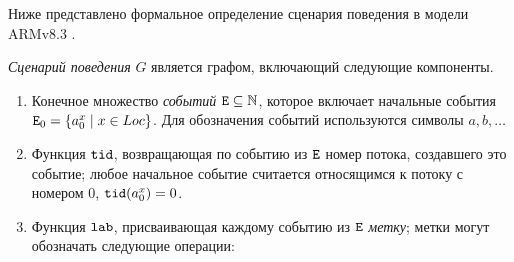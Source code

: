 Ниже представлено формальное определение сценария поведения в
модели ARMv8.3 \cite{Pulte-al:POPL18}.
\begin{definition}
\label{def:execution}
\emph{Сценарий поведения} $G$ является графом, включающий следующие компоненты.
\begin{enumerate}
\item Конечное множество \emph{событий} ${\mathtt{E}} \subseteq \mathbb{N}$, которое включает 
      начальные события ${\mathtt{E}}_0 = \{ a^x_0 \; | \; x \in Loc \}$.
      Для обозначения событий используются символы $a,b,\ldots$
\item Функция ${\mathtt{tid}}$, возвращающая по событию из ${\mathtt{E}}$  номер потока, создавшего это событие;
любое начальное событие считается относящимся к потоку с номером 0, ${\mathtt{tid}}(a^x_0) = 0$.
\item Функция ${\mathtt{lab}}$, присваивающая каждому событию из ${\mathtt{E}}$ \emph{метку}; метки могут обозначать следующие операции: 
      

\end{enumerate}
\end{definition}
